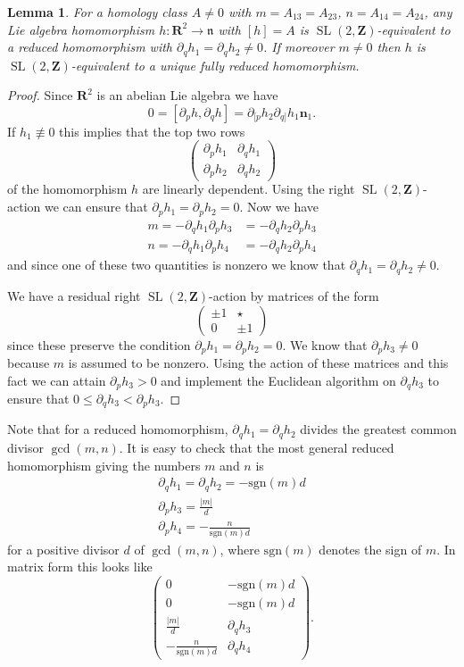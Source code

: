 \documentclass[11pt]{amsart}
\newcommand{\RR}{\mathbf{R}}
\newcommand{\ZZ}{\mathbf{Z}}
\newcommand{\nn}{\mathfrak{n}}
\newcommand{\sgn}{\mathrm{sgn}}
\newcommand{\OP}{\operatorname}
\numberwithin{equation}{section}
\newtheorem{lma}[equation]{Lemma}
\theoremstyle{definition}
\theoremstyle{remark}
\begin{document}
\begin{lma}\label{reparawlog}
For a homology class $A\neq 0$ with $m=A_{13}=A_{23}$, $n=A_{14}=A_{24}$, any Lie algebra homomorphism $h\colon\RR^2\to\nn$ with $[h]=A$ is $\OP{SL}(2,\ZZ)$-equivalent to a reduced homomorphism with $\partial_qh_1=\partial_qh_2\neq 0$. If moreover $m\neq 0$ then $h$ is $\OP{SL}(2,\ZZ)$-equivalent to a {\em unique} fully reduced homomorphism.
\end{lma}
\begin{proof}
Since $\RR^2$ is an abelian Lie algebra we have
\[0=[\partial_ph,\partial_qh]=\partial_{[p}h_2\partial_{q]}h_1\mathbf{n}_1.\]
If $h_1\not\equiv 0$ this implies that the top two rows
\[
\left(\begin{array}{cc}\partial_ph_1 & \partial_qh_1\\
\partial_ph_2 & \partial_qh_2
\end{array}\right)
\]
of the homomorphism $h$ are linearly dependent. Using the right $\OP{SL}(2,\ZZ)$-action we can ensure that $\partial_ph_1=\partial_ph_2=0$. Now we have
\begin{align*}
m=-\partial_qh_1\partial_ph_3&=-\partial_qh_2\partial_ph_3\\
n=-\partial_qh_1\partial_ph_4&=-\partial_qh_2\partial_ph_4
\end{align*}
and since one of these two quantities is nonzero we know that $\partial_qh_1=\partial_qh_2\neq 0$.

We have a residual right $\OP{SL}(2,\ZZ)$-action by matrices of the form
\[
\left(\begin{array}{cc}
\pm 1 & \star\\
0 & \pm 1
\end{array}\right)
\]
since these preserve the condition $\partial_ph_1=\partial_ph_2=0$. We know that $\partial_ph_3\neq 0$ because $m$ is assumed to be nonzero. Using the action of these matrices and this fact we can attain $\partial_ph_3>0$ and implement the Euclidean algorithm on $\partial_qh_3$ to ensure that $0\leq\partial_qh_3<\partial_ph_3$.
\end{proof}

Note that for a reduced homomorphism, $\partial_qh_1=\partial_qh_2$ divides the greatest common divisor $\gcd(m,n)$. It is easy to check that the most general reduced homomorphism giving the numbers $m$ and $n$ is
\begin{gather*}
\partial_qh_1=\partial_qh_2=-\sgn(m)d\\
\partial_ph_3=\frac{|m|}{d}\\
\partial_ph_4=-\frac{n}{\sgn(m)d}
\end{gather*}
for a positive divisor $d$ of $\gcd(m,n)$, where $\sgn(m)$ denotes the sign of $m$. In matrix form this looks like
\begin{equation}\label{normform}\left(\begin{array}{cc}
0 & -\sgn(m)d\\
0 & -\sgn(m)d\\
\frac{|m|}{d} & \partial_qh_3\\
-\frac{n}{\sgn(m)d} & \partial_qh_4
\end{array}\right).\end{equation}
\end{document}
